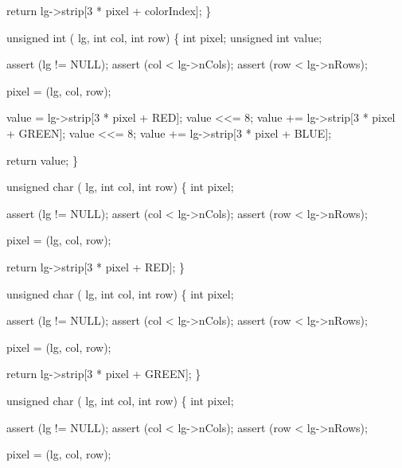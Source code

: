 \documentclass[abstracton,10pt]{scrartcl}%
\begin{document}
    return lg->strip[3 * pixel + colorIndex];
\}

unsigned int  ( lg, int col, int row) \{
    int pixel;
    unsigned int value;

    assert (lg != NULL);
    assert (col < lg->nCols);
    assert (row < lg->nRows);

    pixel =  (lg, col, row);

    value = lg->strip[3 * pixel + RED];
    value <<= 8;
    value += lg->strip[3 * pixel + GREEN];
    value <<= 8;
    value += lg->strip[3 * pixel + BLUE];

    return value;
\}

unsigned char  ( lg, int col, int row) \{
    int pixel;

    assert (lg != NULL);
    assert (col < lg->nCols);
    assert (row < lg->nRows);

    pixel =  (lg, col, row);

    return lg->strip[3 * pixel + RED];
\}

unsigned char  ( lg, int col, int row) \{
    int pixel;

    assert (lg != NULL);
    assert (col < lg->nCols);
    assert (row < lg->nRows);

    pixel =  (lg, col, row);

    return lg->strip[3 * pixel + GREEN];
\}

unsigned char  ( lg, int col, int row) \{
    int pixel;

    assert (lg != NULL);
    assert (col < lg->nCols);
    assert (row < lg->nRows);

    pixel =  (lg, col, row);
\end{document}
